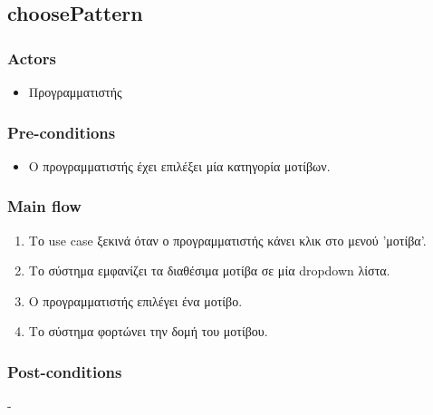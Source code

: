 \documentclass[../diploma_thesis.tex]{subfiles}
\begin{document}
\subsection{choosePattern}
\subsubsection{Actors}
\begin{itemize}
\item  Προγραμματιστής
\end{itemize}
\subsubsection{Pre-conditions}
\begin{itemize}
\item  Ο προγραμματιστής έχει επιλέξει μία κατηγορία μοτίβων.
\end{itemize}
\subsubsection{Main flow}
\begin{enumerate}
\item Το use case ξεκινά όταν ο προγραμματιστής κάνει κλικ στο μενού 'μοτίβα'.
\item Το σύστημα εμφανίζει τα διαθέσιμα μοτίβα σε μία dropdown λίστα.
\item Ο προγραμματιστής επιλέγει ένα μοτίβο.
\item Το σύστημα φορτώνει την δομή του μοτίβου.
\end{enumerate}
\subsubsection{Post-conditions}
-
\end{document}
